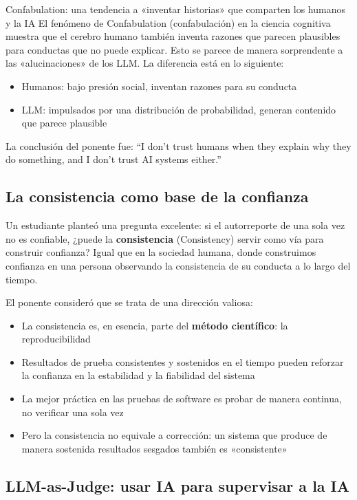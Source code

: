 \begin{importantbox}{Confabulation: una tendencia a «inventar historias» que comparten los humanos y la IA}
El fenómeno de Confabulation (confabulación) en la ciencia cognitiva muestra que el cerebro humano también inventa razones que parecen plausibles para conductas que no puede explicar. Esto se parece de manera sorprendente a las «alucinaciones» de los LLM. La diferencia está en lo siguiente:
\begin{itemize}
    \item Humanos: bajo presión social, inventan razones para su conducta
    \item LLM: impulsados por una distribución de probabilidad, generan contenido que parece plausible
\end{itemize}
La conclusión del ponente fue: ``I don't trust humans when they explain why they do something, and I don't trust AI systems either.''
\end{importantbox}

\subsection{La consistencia como base de la confianza}

Un estudiante planteó una pregunta excelente: si el autorreporte de una sola vez no es confiable, ¿puede la \textbf{consistencia} (Consistency) servir como vía para construir confianza? Igual que en la sociedad humana, donde construimos confianza en una persona observando la consistencia de su conducta a lo largo del tiempo.

El ponente consideró que se trata de una dirección valiosa:

\begin{itemize}
    \item La consistencia es, en esencia, parte del \textbf{método científico}: la reproducibilidad
    \item Resultados de prueba consistentes y sostenidos en el tiempo pueden reforzar la confianza en la estabilidad y la fiabilidad del sistema
    \item La mejor práctica en las pruebas de software es probar de manera continua, no verificar una sola vez
    \item Pero la consistencia no equivale a corrección: un sistema que produce de manera sostenida resultados sesgados también es «consistente»
\end{itemize}

\subsection{LLM-as-Judge: usar IA para supervisar a la IA}

